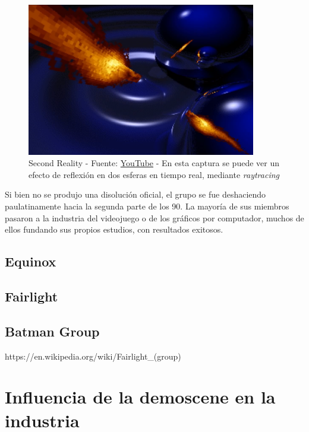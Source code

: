 \begin{figure}[h]
	\centering
	\includegraphics[width=10cm]{archivos/second-reality}
	\caption{Second Reality - Fuente: \href{https://www.youtube.com/watch?v=XezcZVu66QI}{YouTube} - En esta captura se puede ver un efecto de reflexión en dos esferas en tiempo real, mediante \emph{raytracing}}
	\label{fig:secondreality}
\end{figure}

Si bien no se produjo una disolución oficial, el grupo se fue deshaciendo paulatinamente hacia la segunda parte de los 90. La mayoría de sus miembros pasaron a la industria del videojuego o de los gráficos por computador, muchos de ellos fundando sus propios estudios, con resultados exitosos.

\subsection{Equinox}
\subsection{Fairlight}
\subsection{Batman Group}

https://en.wikipedia.org/wiki/Fairlight_(group)

\section{Influencia de la demoscene en la industria}

